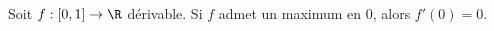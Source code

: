 Soit $f : \left[ 0, 1 \right] \to \R$ dérivable. \newline Si $f$ admet un maximum en $0$, alors $f'(0)=0$.

\begin{reponses}
\end{reponses}

